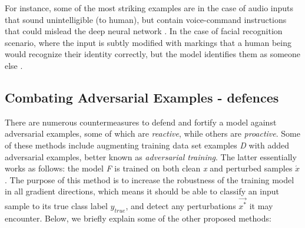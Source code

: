 \documentclass[grad,lot,lof,11pt,oneside,onehalfspace]{RUthesis}
\begin{document}
For instance, some of the most striking examples are in the case of audio inputs that sound unintelligible (to human), but contain voice-command instructions that could mislead the deep neural network \cite{kurakin_adversarial_2017}. In the case of facial recognition scenario, where the input is subtly modified with markings that a human being would recognize their identity correctly, but the model identifies them as someone else \cite{kurakin_adversarial_2017}.

\subsection{Combating Adversarial Examples - defences}
There are numerous countermeasures to defend and fortify a model against adversarial examples, some of which are \textit{reactive}, while others are \textit{proactive}. Some of these methods include augmenting training data set examples \textit{D} with added adversarial examples, better known as \textit{adversarial training}. The latter essentially works as follows: the model \textit{F} is trained on both clean \textit{x} and perturbed samples $\acute{x}$. The purpose of this method is to increase the robustness of the training model in all gradient directions, which means it should be able to classify an input sample to its true class label $y_{true}$, and detect any perturbations $\vec{x^{*}}$ it may encounter. Below, we briefly explain some of the other proposed methods:
\end{document}
